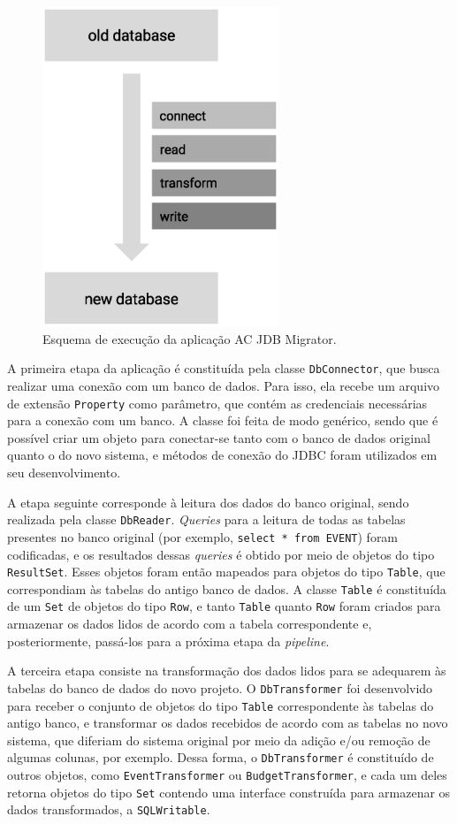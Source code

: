 \begin{figure}[htb!]
  \centering
  \caption{Esquema de execução da aplicação AC JDB Migrator.}
  \label{fig:java-jdbm}
  \includegraphics[width=200pt, keepaspectratio=true]{img/java-jdbm}
\end{figure}

A primeira etapa da aplicação é constituída pela classe \verb|DbConnector|, que busca realizar uma conexão com um banco de dados. Para isso, ela recebe um arquivo de extensão \verb|Property| como parâmetro, que contém as credenciais necessárias para a conexão com um banco. A classe foi feita de modo genérico, sendo que é possível criar um objeto para conectar-se tanto com o banco de dados original quanto o do novo sistema, e métodos de conexão do JDBC foram utilizados em seu desenvolvimento.

A etapa seguinte corresponde à leitura dos dados do banco original, sendo realizada pela classe \verb|DbReader|. \textit{Queries} para a leitura de todas as tabelas presentes no banco original (por exemplo, \verb|select * from EVENT|) foram codificadas, e os resultados dessas \textit{queries} é obtido por meio de objetos do tipo \verb|ResultSet|. Esses objetos foram então mapeados para objetos do tipo \verb|Table|, que correspondiam às tabelas do antigo banco de dados. A classe \verb|Table| é constituída de um \verb|Set| de objetos do tipo \verb|Row|, e tanto \verb|Table| quanto \verb|Row| foram criados para armazenar os dados lidos de acordo com a tabela correspondente e, posteriormente, passá-los para a próxima etapa da \textit{pipeline}.

A terceira etapa consiste na transformação dos dados lidos para se adequarem às tabelas do banco de dados do novo projeto. O \verb|DbTransformer| foi desenvolvido para receber o conjunto de objetos do tipo \verb|Table| correspondente às tabelas do antigo banco, e transformar os dados recebidos de acordo com as tabelas no novo sistema, que diferiam do sistema original por meio da adição e/ou remoção de algumas colunas, por exemplo. Dessa forma, o \verb|DbTransformer| é constituído de outros objetos, como \verb|EventTransformer| ou \verb|BudgetTransformer|, e cada um deles retorna objetos do tipo \verb|Set| contendo uma interface construída para armazenar os dados transformados, a \verb|SQLWritable|.

